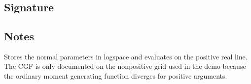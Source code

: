 \documentclass[letterpaper,10pt,english]{sphinxmanual}
\begin{document}
\section{}
\label{\detokenize{object_api_reference:lognormal}}

\subsection{Signature}
\label{\detokenize{object_api_reference:id25}}
\begin{sphinxVerbatim}[commandchars=\\\{\}]

\end{sphinxVerbatim}


\subsection{Notes}
\label{\detokenize{object_api_reference:id26}}
\sphinxAtStartPar
Stores the normal parameters in log\sphinxhyphen{}space and evaluates on the positive real line. The CGF is only documented on the nonpositive grid used in the demo because the ordinary moment generating function diverges for positive arguments.
\end{document}
